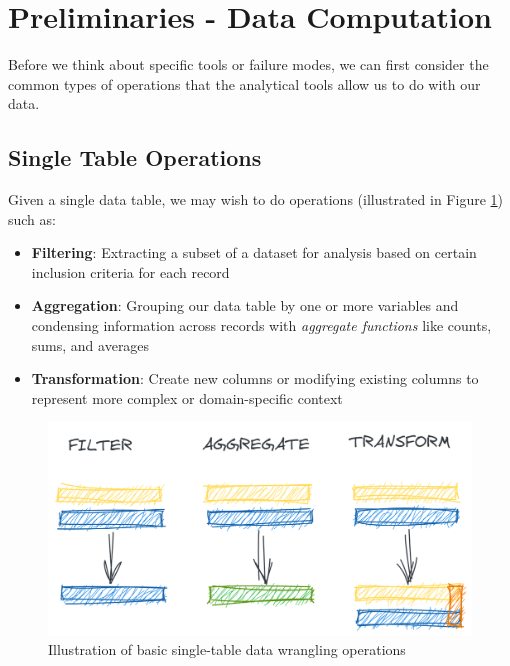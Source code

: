 \documentclass[
]{krantz}
\providecommand{\tightlist}{%
  \setlength{\itemsep}{0pt}\setlength{\parskip}{0pt}}
\begin{document}
\hypertarget{preliminaries---data-computation}{%
\section{Preliminaries - Data Computation}\label{preliminaries---data-computation}}

Before we think about specific tools or failure modes, we can first consider the common types of operations that the analytical tools allow us to do with our data.

\hypertarget{single-table-operations}{%
\subsection{Single Table Operations}\label{single-table-operations}}

Given a single data table, we may wish to do operations (illustrated in Figure \ref{fig:filt-aggr-tran}) such as:

\begin{itemize}
\tightlist
\item
  \textbf{Filtering}: Extracting a subset of a dataset for analysis based on certain inclusion criteria for each record
\item
  \textbf{Aggregation}: Grouping our data table by one or more variables and condensing information across records with \emph{aggregate functions} like counts, sums, and averages
\item
  \textbf{Transformation}: Create new columns or modifying existing columns to represent more complex or domain-specific context
\end{itemize}

\begin{figure}

{\centering \includegraphics[width=0.9\linewidth]{figures/comp-quan/filt-aggr-tran} 

}

\caption{Illustration of basic single-table data wrangling operations}\label{fig:filt-aggr-tran}
\end{figure}
\end{document}
